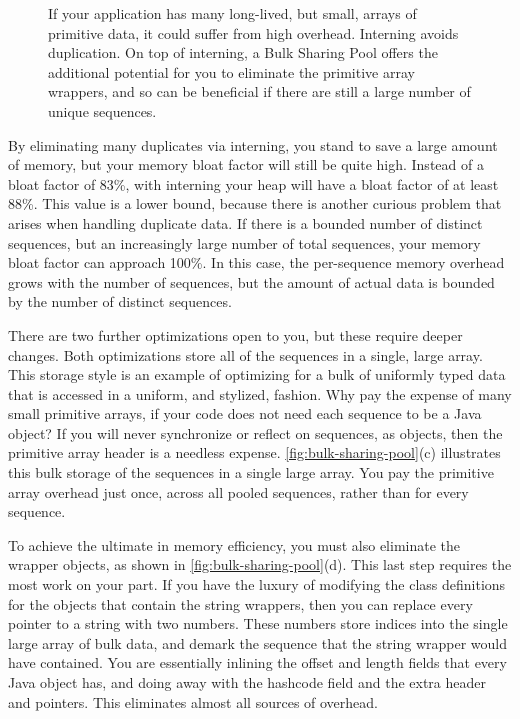 \begin{figure}
	\caption{If your application has many long-lived, but small, arrays of
	primitive data, it could suffer from high overhead. Interning avoids
	duplication. On top of interning, a Bulk Sharing Pool offers the additional
	potential for you to eliminate the primitive array wrappers, and so can be
	beneficial if there are still a large number of unique sequences.}
	\label{fig:bulk-sharing-pool}
\end{figure}

By eliminating many duplicates via interning, you stand to save a large amount of
memory, but your memory bloat factor will still be quite high. Instead of a bloat
factor of 83\%, with interning your heap will have a bloat factor of at least
88\%.
This value is a lower bound, because there is another curious problem that arises
when handling duplicate data. If there is a bounded number of distinct sequences,
but an increasingly large number of total sequences, your memory bloat factor can
approach 100\%. In this case, the per-sequence memory overhead grows with the
number of sequences, but the amount of actual data is bounded by the number of
distinct sequences.

There are two further optimizations open to you, but these require deeper
changes. Both optimizations store all of the sequences in a single, large array.
This storage style is an example of optimizing for a bulk of uniformly typed data
that is accessed in a uniform, and stylized, fashion. Why pay the expense of many
small primitive arrays, if your code does not need each sequence to be a Java
object? If you will never synchronize or reflect on sequences, as objects, then
the primitive array header is a needless expense.
\autoref{fig:bulk-sharing-pool}(c) illustrates this bulk storage of the
sequences in a single large array. You pay the primitive array overhead just once, across
all pooled sequences, rather than for every sequence. 

To achieve the ultimate in memory efficiency, you must also eliminate the
 wrapper objects, as shown in \autoref{fig:bulk-sharing-pool}(d).
This last step requires the most work on your part. If you have the luxury of
modifying the class definitions for the objects that contain the string
wrappers, then you can replace every pointer to a string with two numbers. These
numbers store indices into the single large array of bulk data, and demark the
sequence that the string wrapper would have contained. You are essentially
inlining the offset and length fields that every Java  object has,
and doing away with the hashcode field and the extra header and pointers. This
eliminates almost all sources of overhead.

